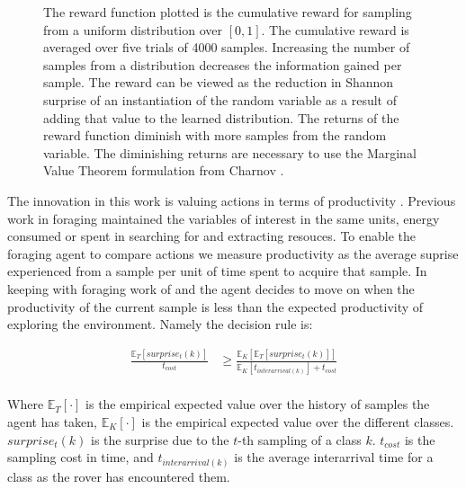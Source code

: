 \begin{figure}%
	\centering
	\def\svgwidth{0.8\columnwidth}
	
	\caption{The reward function plotted is the cumulative reward for sampling from a uniform distribution over $\left[0,1\right]$.  The cumulative reward is averaged over five trials of 4000 samples.  Increasing the number of samples from a distribution decreases the information gained per sample.  The reward can be viewed as the reduction in Shannon surprise of an instantiation of the random variable as a result of adding that value to the learned distribution.  The returns of the reward function diminish with more samples from the random variable.  The diminishing returns are necessary to use the Marginal Value Theorem formulation from Charnov \cite{charnov1976optimal}.}
	\label{fig:reward}
\end{figure}

The innovation in this work is valuing actions in terms of productivity .  Previous work in foraging maintained the variables of interest in the same units, energy consumed or spent in searching for and extracting resouces.  To enable the foraging agent to compare actions we measure productivity as the average suprise experienced from a sample per unit of time spent to acquire that sample.  In keeping with foraging work of \cite{charnov1976optimal} and \cite{pirolli1999information} the agent decides to move on when the productivity of the current sample is less than the expected productivity of exploring the environment.  Namely the decision rule is:

\begin{align*}
	\frac{\mathbb{E}_{T}\left[surprise_{t}\left(k\right)\right]}{t_{cost}} &\geq \frac{\mathbb{E}_{K}\left[\mathbb{E}_{T}\left[surprise_{t}\left(k\right)\right]\right]}{\mathbb{E}_{K}\left[t_{interarrival(k)}\right] + t_{cost}}\\
\end{align*}

Where $\mathbb{E}_{T}\left[\cdot\right]$ is the empirical expected value over the history of samples the agent has taken, $\mathbb{E}_{K}\left[\cdot\right]$ is the empirical expected value over the different classes. $surprise_{t}(k)$ is the surprise due to the $t$-th sampling of a class $k$.  $t_{cost}$ is the sampling cost in time, and $t_{interarrival(k)}$ is the average interarrival time for a class as the rover has encountered them.



